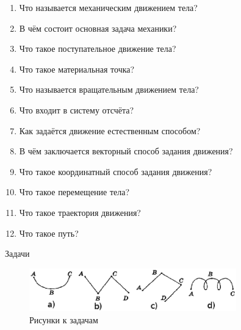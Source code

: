 \documentclass[a6paper, 11pt]{diss_4}
\renewcommand{\'}{\,'}
\begin{document}
\begin{enumerate}
\item Что называется механическим движением тела?
\item В чём состоит основная задача механики?
\item Что такое поступательное движение тела?
\item Что такое материальная точка?
\item Что называется вращательным движением тела?
\item Что входит в систему отсчёта?
\item Как задаётся движение естественным способом?
\item В чём заключается векторный способ задания движения?
\item Что такое координатный способ задания движения?
\item Что такое перемещение тела?
\item Что такое траектория движения?
\item Что такое путь?
\end{enumerate}

\begin{center}
   Задачи
\end{center}
\begin{figure}
\includegraphics[width=0.8\textwidth]{img/ex15.eps}
\caption{Рисунки к задачам}
\label{ris}
\end{figure}
\end{document}
